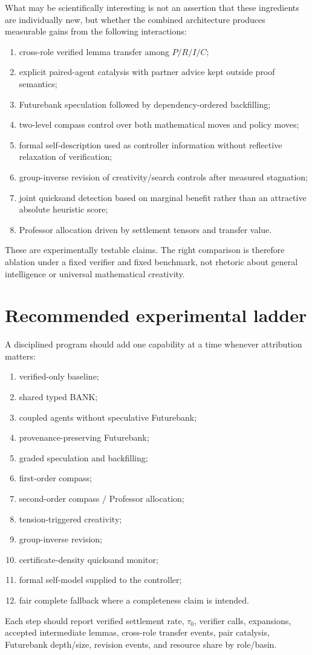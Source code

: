 \documentclass[11pt]{article}
\begin{document}
What may be scientifically interesting is not an assertion that these ingredients are individually new, but whether the combined architecture produces measurable gains from the following interactions:
\begin{enumerate}
\item cross-role verified lemma transfer among $P/R/I/C$;
\item explicit paired-agent catalysis with partner advice kept outside proof semantics;
\item Futurebank speculation followed by dependency-ordered backfilling;
\item two-level compass control over both mathematical moves and policy moves;
\item formal self-description used as controller information without reflective relaxation of verification;
\item group-inverse revision of creativity/search controls after measured stagnation;
\item joint quicksand detection based on marginal benefit rather than an attractive absolute heuristic score;
\item Professor allocation driven by settlement tensors and transfer value.
\end{enumerate}
These are experimentally testable claims. The right comparison is therefore ablation under a fixed verifier and fixed benchmark, not rhetoric about general intelligence or universal mathematical creativity.

\section{Recommended experimental ladder}

A disciplined program should add one capability at a time whenever attribution matters:
\begin{enumerate}
\item verified-only baseline;
\item shared typed BANK;
\item coupled agents without speculative Futurebank;
\item provenance-preserving Futurebank;
\item graded speculation and backfilling;
\item first-order compass;
\item second-order compass / Professor allocation;
\item tension-triggered creativity;
\item group-inverse revision;
\item certificate-density quicksand monitor;
\item formal self-model supplied to the controller;
\item fair complete fallback where a completeness claim is intended.
\end{enumerate}
Each step should report verified settlement rate, $\tau_0$, verifier calls, expansions, accepted intermediate lemmas, cross-role transfer events, pair catalysis, Futurebank depth/size, revision events, and resource share by role/basin.
\end{document}
